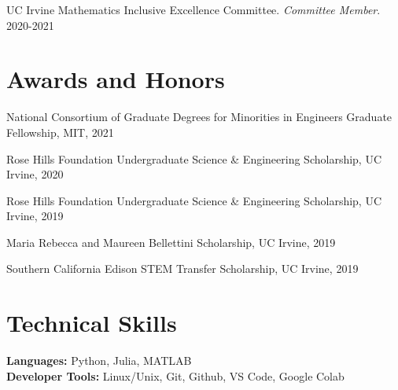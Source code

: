 \documentclass[letterpaper,11pt]{article}
\begin{document}
UC Irvine Mathematics Inclusive Excellence Committee. \textit{Committee Member}. {2020-2021}

\section{Awards and Honors}
National Consortium of Graduate Degrees for Minorities in Engineers Graduate Fellowship, MIT, 2021

Rose Hills Foundation Undergraduate Science \& Engineering Scholarship, UC Irvine, 2020 

Rose Hills Foundation Undergraduate Science \& Engineering Scholarship, UC Irvine, 2019 

Maria Rebecca and Maureen Bellettini Scholarship, UC Irvine, 2019 

Southern California Edison STEM Transfer Scholarship, UC Irvine, 2019

%
\section{Technical Skills}
 \begin{itemize}[leftmargin=0.15in, label={}]
    \small{\item{
     \textbf{Languages:}{ Python, Julia, MATLAB} \\
     \textbf{Developer Tools:}{ Linux/Unix, Git, Github, VS Code, Google Colab} \\
    }}
 \end{itemize}


\end{document}
